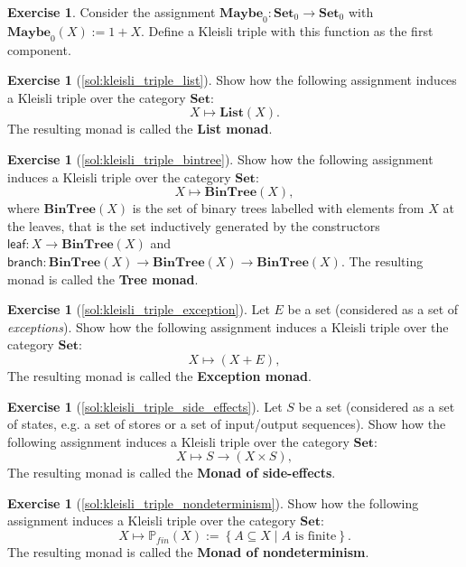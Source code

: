 \documentclass[a4paper,11pt, oneside,titlepage=false]{scrbook}
\theoremstyle{plain}
\theoremstyle{definition}
\newtheorem{exer}[thm]{Exercise}
\newcommand{\Catb}[1]{\mathbf{#1}}
\newcommand{\List}{\Catb{List}}
\newcommand{\BinTree}{\Catb{BinTree}}
\newcommand{\Maybe}{\Catb{Maybe}}
\newcommand{\SET}{\Catb{Set}}
\newcommand{\Ob}[1]{{#1}_0}
\begin{document}
\begin{exer}
  Consider the assignment $\Ob{\Maybe} : \Ob{\SET}\to \Ob{\SET}$ with $\Ob{\Maybe}(X) := 1 + X$.
  Define a Kleisli triple with this function as the first component.
\end{exer}

\begin{exer}[\cref{sol:kleisli_triple_list}]\label{exer:kleisli_triple_list} Show how the following assignment induces a Kleisli triple over the category $\SET$:
\[
X\mapsto \List(X).
\]
The resulting monad is called the \textbf{List monad}.
\end{exer}

\begin{exer}[\cref{sol:kleisli_triple_bintree}]\label{exer:kleisli_triple_bintree} Show how the following assignment induces a Kleisli triple over the category $\SET$:
\[
X\mapsto \BinTree(X),
\]
where $\BinTree(X)$ is the set of binary trees labelled with elements from $X$ at the leaves, that is the set inductively generated by the constructors $\mathsf{leaf}: X\to \BinTree(X)$ and $\mathsf{branch} : \BinTree(X)\to \BinTree(X)\to \BinTree(X)$.
The resulting monad is called the \textbf{Tree monad}.
\end{exer}

\begin{exer}[\cref{sol:kleisli_triple_exception}]\label{exer:kleisli_triple_exception} Let $E$ be a set (considered as a set of \textit{exceptions}). Show how the following assignment induces a Kleisli triple over the category $\SET$:
\[
X\mapsto (X + E),
\]
The resulting monad is called the \textbf{Exception monad}.
\end{exer}

\begin{exer}[\cref{sol:kleisli_triple_side_effects}]\label{exer:kleisli_triple_side_effects} Let $S$ be a set (considered as a set of states, e.g. a set of stores or a set of input/output sequences). Show how the following assignment induces a Kleisli triple over the category $\SET$:
\[
X\mapsto S \to (X \times S),
\]
The resulting monad is called the \textbf{Monad of side-effects}.
\end{exer}

\begin{exer}[\cref{sol:kleisli_triple_nondeterminism}]\label{exer:kleisli_triple_nondeterminism} Show how the following assignment induces a Kleisli triple over the category $\SET$:
\[
X\mapsto \mathbb{P}_{fin}(X) := \left\{A\subseteq X \mid  A \text{ is finite}\right\}.
\]
The resulting monad is called the \textbf{Monad of nondeterminism}.
\end{exer}
\end{document}
